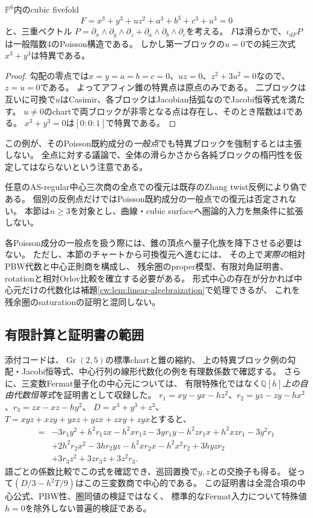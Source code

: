 \begin{example}[全体が滑らかでも純ブロックは特異になり得る]
\label{cw:ex:singular-block}
$\mathbb P^6$内のcubic fivefold
\[
 F=x^3+y^3+u z^2+a^3+b^3+c^3+u^3=0
\]
と、三重ベクトル
$P=\partial_x\wedge\partial_y\wedge\partial_z+
\partial_a\wedge\partial_b\wedge\partial_c$を考える。
$F$は滑らかで、$\iota_{dF}P$は一般階数4のPoisson構造である。
しかし第一ブロックの$u=0$での純三次式$x^3+y^3$は特異である。
\end{example}
\begin{proof}
勾配の零点では$x=y=a=b=c=0$、$uz=0$、$z^2+3u^2=0$なので、$z=u=0$である。
よってアフィン錐の特異点は原点のみである。
二ブロックは互いに可換で$u$はCasimir、各ブロックはJacobian括弧なのでJacobi恒等式を満たす。
$u\ne0$のchartで両ブロックが非零となる点は存在し、そのとき階数は4である。
$x^3+y^3=0$は$[0:0:1]$で特異である。
\end{proof}
\begin{remark}
この例が、そのPoisson既約成分の\emph{一般点}でも特異ブロックを強制するとは主張しない。
全点に対する議論で、全体の滑らかさから各純ブロックの楕円性を仮定してはならないという注意である。
\end{remark}

\begin{remark}[全非可換成分との区別]\label{rem:all-components-nc-scope}
任意のAS-regular中心三次商の全点での復元は既存のZhang twist反例により偽である。
個別の反例点だけではPoisson既約成分の一般点での復元は否定されない。
本節は$n\ge3$を対象とし、曲線・cubic surfaceへ圏論的入力を無条件に拡張しない。
\end{remark}

各Poisson成分の一般点を扱う際には、錐の頂点へ量子化族を降下させる必要はない。
ただし、本節のチャートから可換復元へ進むには、
その上で\emph{実際の}相対PBW代数と中心正則商を構成し、
残余圏のproper模型、有限対角証明書、rotationと相対Orlov比較を確立する必要がある。
形式中心の存在が分かれば中心元だけの代数化は補題\ref{cw:lem:linear-algebraization}で処理できるが、
これを残余圏のsaturationの証明と混同しない。

\subsection{有限計算と証明書の範囲}

添付コードは、$\operatorname{Gr}(2,5)$の標準chartと錐の縮約、
上の特異ブロック例の勾配・Jacobi恒等式、中心行列の線形代数化の例を有理数係数で確認する。
さらに、三変数Fermat量子化の中心元については、
有限特殊化ではなく\emph{$\mathbb Q[h]$上の自由代数恒等式}を証明書として収録した。
$r_1=xy-yx-hz^2$、$r_2=yz-zy-hx^2$、$r_3=zx-xz-hy^2$、
$D=x^3+y^3+z^3$、$T=xyz+xzy+yxz+yzx+zxy+zyx$とすると、
\begin{align*}
 [3D-h^2T,x]={}&-3r_1y^2+h^2r_1zx-h^2xr_1z-3yr_1y-h^2zr_1x
 +h^2xzr_1-3y^2r_1\\
 &+2h^2r_2x^2-3hr_2yz-h^2xr_2x-h^2x^2r_2+3hyzr_2\\
 &+3r_3z^2+3zr_3z+3z^2r_3.
\end{align*}
語ごとの係数比較でこの式を確認でき、巡回置換で$y,z$との交換子も得る。
従って$(D/3-h^2T/9)$はこの三変数商で中心的である。
この証明書は全混合項の中心公式、PBW性、圏同値の検証ではなく、
標準的なFermat入力について特殊値$h=0$を除外しない普遍的検証である。
